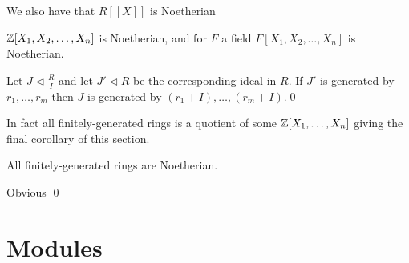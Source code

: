 \documentclass{article}
\newcommand{\nrm}{\triangleleft}
\begin{document}
\par
We also have that $ R[[X]] $ is Noetherian
\begin{corollary}
	$ \mathbb{Z}[X_1,X_2,\dots, X_n] $ is Noetherian, and for $ F $ a field $ F[X_1,X_2,\dots, X_n]  $ is Noetherian.
\end{corollary}
\pf Let $ J\nrm \frac RI  $ and let $ J'\nrm R $ be the corresponding ideal in $ R $. If $ J' $ is generated by $ r_1,\dots, r_m $ then $ J $ is generated by $ (r_1+I),\dots, (r_m+I) $.\qed
\par
In fact all finitely-generated rings is a quotient of some $ \mathbb{Z}[X_1,\dots, X_n] $ giving the final corollary of this section.
\begin{corollary}
  All finitely-generated rings are Noetherian.
\end{corollary}
\pf Obvious \qed
\section{Modules}
\end{document}
